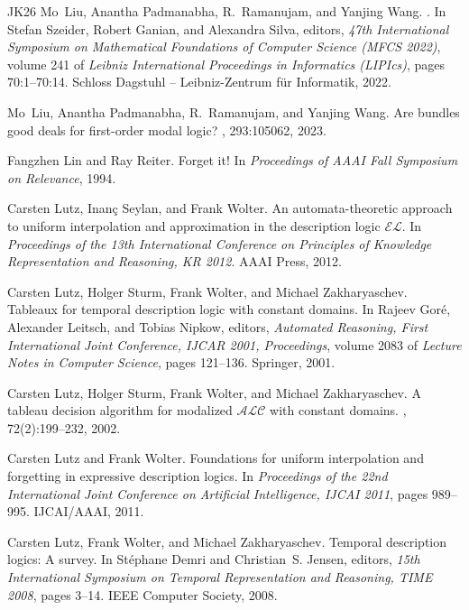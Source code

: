 \documentclass[10pt,a4paper]{amsart}
\theoremstyle{plain}
\theoremstyle{definition}
\begin{document}
\begin{thebibliography}{{}JK{\etalchar{+}}26}
Mo~Liu, Anantha Padmanabha, R.~Ramanujam, and Yanjing Wang.
.
\newblock In Stefan Szeider, Robert Ganian, and Alexandra Silva, editors, {\em 47th International Symposium on Mathematical Foundations of Computer Science (MFCS 2022)}, volume 241 of {\em Leibniz International Proceedings in Informatics (LIPIcs)}, pages 70:1--70:14. Schloss Dagstuhl -- Leibniz-Zentrum f{\"u}r Informatik, 2022.

Mo~Liu, Anantha Padmanabha, R.~Ramanujam, and Yanjing Wang.
\newblock Are bundles good deals for first-order modal logic?
, 293:105062, 2023.

Fangzhen Lin and Ray Reiter.
\newblock Forget it!
\newblock In {\em Proceedings of AAAI Fall Symposium on Relevance}, 1994.

Carsten Lutz, Inan{\c{c}} Seylan, and Frank Wolter.
\newblock An automata-theoretic approach to uniform interpolation and approximation in the description logic {$\mathcal{EL}$}.
\newblock In {\em Proceedings of the 13th International Conference on Principles of Knowledge Representation and Reasoning, {KR} 2012}. {AAAI} Press, 2012.

Carsten Lutz, Holger Sturm, Frank Wolter, and Michael Zakharyaschev.
\newblock Tableaux for temporal description logic with constant domains.
\newblock In Rajeev Gor{\'{e}}, Alexander Leitsch, and Tobias Nipkow, editors, {\em Automated Reasoning, First International Joint Conference, {IJCAR} 2001, Proceedings}, volume 2083 of {\em Lecture Notes in Computer Science}, pages 121--136. Springer, 2001.

Carsten Lutz, Holger Sturm, Frank Wolter, and Michael Zakharyaschev.
\newblock A tableau decision algorithm for modalized {$\mathcal{ALC}$} with constant domains.
, 72(2):199--232, 2002.

Carsten Lutz and Frank Wolter.
\newblock Foundations for uniform interpolation and forgetting in expressive description logics.
\newblock In {\em Proceedings of the 22nd International Joint Conference on Artificial Intelligence, {IJCAI} 2011}, pages 989--995. {IJCAI/AAAI}, 2011.

Carsten Lutz, Frank Wolter, and Michael Zakharyaschev.
\newblock Temporal description logics: {A} survey.
\newblock In St{\'{e}}phane Demri and Christian~S. Jensen, editors, {\em 15th International Symposium on Temporal Representation and Reasoning, {TIME} 2008}, pages 3--14. {IEEE} Computer Society, 2008.


\end{thebibliography}
\end{document}
